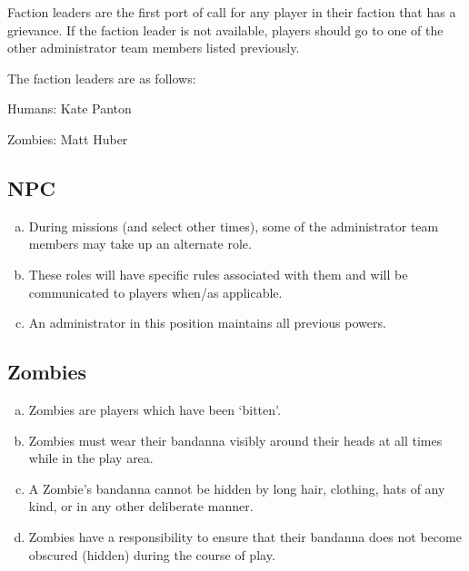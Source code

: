 \documentclass[a4paper,12pt]{article}
\newcommand{\HumanLeader}{Kate Panton}
\newcommand{\ZombieLeader}{Matt Huber}
\begin{document}
Faction leaders are the first port of call for any player in their faction that has a grievance. If the faction leader is not available, players should go to one of the other administrator team members listed previously.

The faction leaders are as follows:

\begin{center}
    \par Humans: \HumanLeader
    \par Zombies: \ZombieLeader
\end{center}


%

\subsection{NPC}

\begin{enumerate}[(a)]
    \item During missions (and select other times), some of the administrator team members may take up an alternate role.
    \item These roles will have specific rules associated with them and will be communicated to players when/as applicable.
    \item An administrator in this position maintains all previous powers.    
\end{enumerate}

\subsection{Zombies}

\begin{enumerate}[(a)]
    \item Zombies are players which have been `bitten'.
    \item Zombies must wear their bandanna visibly around their heads at all times while in the play area.
    \item A Zombie's bandanna cannot be hidden by long hair, clothing, hats of any kind, or in any other deliberate manner.
    \item Zombies have a responsibility to ensure that their bandanna does not become obscured (hidden) during the course of play.

\end{enumerate}
\end{document}
